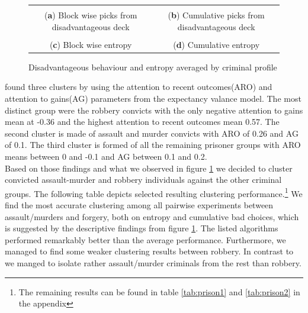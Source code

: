 \documentclass[12pt,a4paper,bibliography=totocnumbered,listof=totocnumbered]{scrartcl}
\begin{document}
{\renewcommand{\arraystretch}{0.4}%
\begin{figure}[H]
	\centering
	\small
	\hspace*{-0.7in}
	\begin{tabular}{cc}
	 &  \\
	(\textbf{a}) Block wise picks from disadvantageous deck & (\textbf{b}) Cumulative picks from disadvantageous deck  \\
	 &  \\
	(\textbf{c}) Block wise entropy  & (\textbf{d}) Cumulative entropy 
	\end{tabular} \quad
	\caption{Disadvantageous behaviour and entropy averaged by criminal profile }
	\label{fig:ent}
\end{figure}

\cite{Yechiam2008} found three clusters by using the attention to recent outcomes(ARO) and attention to gains(AG) parameters from the expectancy valance model. The most distinct group were the robbery convicts with the only negative attention to gains mean at -0.36 and the highest attention to recent outcomes mean 0.57. The second cluster is made of assault and murder convicts with ARO of 0.26 and AG of 0.1. The third cluster is formed of all the remaining prisoner groups with ARO means between 0 and -0.1 and AG between 0.1 and 0.2.\\
Based on those findings and what we observed in figure \ref{fig:ent} we decided to cluster convicted assault-murder and robbery individuals against the other criminal groups. The following table depicts selected resulting clustering performance.\footnote{The remaining results can be found in table  \ref{tab:prison1} and \ref{tab:prison2} in the appendix} We find the most accurate clustering among all pairwise experiments between assault/murders and forgery, both on entropy and cumulative bad choices, which is suggested by the descriptive findings from figure \ref{fig:ent}. The listed algorithms performed remarkably better than the average performance. Furthermore, we managed to find some weaker clustering results between robbery. In contrast to \cite{Yechiam2008} we manged to isolate rather assault/murder criminals from the rest than robbery.

}
\end{document}
